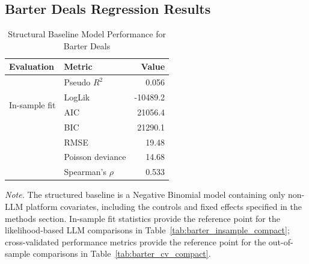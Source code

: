 \subsection{Barter Deals Regression Results}
\label{app:barter_full_results}


\begin{table}[ht]
    \centering
    \caption{Structural Baseline Model Performance for Barter Deals}
    \label{tab:barter_baseline_performance}
    \begin{tabular}{llr}
    \toprule
    Evaluation & Metric & Value \\
    \midrule
    \multirow{4}{*}{In-sample fit} 
        & Pseudo $R^2$ & 0.056 \\
        & LogLik       & -10489.2 \\
        & AIC          & 21056.4 \\
        & BIC          & 21290.1 \\
    \addlinespace[0.5em]
    \multirow{3}{*}{Cross-validated performance}
        & RMSE                 & 19.48 \\
        & Poisson deviance      & 14.68 \\
        & Spearman's $\rho$     & 0.533 \\
    \bottomrule
    \end{tabular}

    \begin{flushleft}
    \footnotesize
    \textit{Note.} The structured baseline is a Negative Binomial model containing only non-LLM platform covariates, including the controls and fixed effects specified in the methods section. In-sample fit statistics provide the reference point for the likelihood-based LLM comparisons in Table~\ref{tab:barter_insample_compact}; cross-validated performance metrics provide the reference point for the out-of-sample comparisons in Table~\ref{tab:barter_cv_compact}.
    \end{flushleft}
\end{table}



